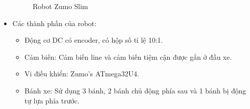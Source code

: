 \begin{itemize}
\begin{figure}[H]
\begin{subfigure}{0.6\textwidth}
            \label{chap1_pic10b}
            \end{subfigure}
            \caption{Robot Zumo Slim}
            \label{chap1_pic10}
        \end{figure}
        \item Các thành phần của robot:
            \begin{itemize}[label=\textendash]
                \item Động cơ DC có encoder, có hộp số tỉ lệ 10:1.
                \item Cảm biến: Cảm biến line và cảm biến tiệm cận được gắn ở đầu xe.
                \item Vi điều khiển: Zumo's ATmega32U4.
                \item Bánh xe: Sử dụng 3 bánh, 2 bánh chủ động phía sau và 1 bánh bị động tự lựa phía trước.
            \end{itemize}
    \end{itemize}

